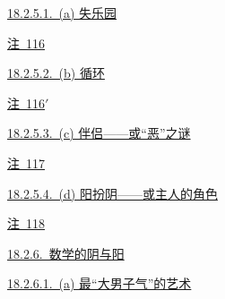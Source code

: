 \par\noindent\hspace*{2.70em}\hyperref[ch18:local:h22]{18.2.5.1.~(a) 失乐园}\nobreak\dotfill\nobreak\hyperref[ch18:local:h22]{\pageref*{ch18:local:h22}}\par
\par\noindent\hspace*{4.05em}\hyperref[ch18:local:n19]{注~116}\nobreak\dotfill\nobreak\hyperref[ch18:local:n19]{\pageref*{ch18:local:n19}}\par
\par\noindent\hspace*{2.70em}\hyperref[ch18:local:h23]{18.2.5.2.~(b) 循环}\nobreak\dotfill\nobreak\hyperref[ch18:local:h23]{\pageref*{ch18:local:h23}}\par
\par\noindent\hspace*{4.05em}\hyperref[ch18:local:n20]{注~116$'$}\nobreak\dotfill\nobreak\hyperref[ch18:local:n20]{\pageref*{ch18:local:n20}}\par
\par\noindent\hspace*{2.70em}\hyperref[ch18:local:h24]{18.2.5.3.~(c) 伴侣——或“恶”之谜}\nobreak\dotfill\nobreak\hyperref[ch18:local:h24]{\pageref*{ch18:local:h24}}\par
\par\noindent\hspace*{4.05em}\hyperref[ch18:local:n21]{注~117}\nobreak\dotfill\nobreak\hyperref[ch18:local:n21]{\pageref*{ch18:local:n21}}\par
\par\noindent\hspace*{2.70em}\hyperref[ch18:local:h25]{18.2.5.4.~(d) 阳扮阴——或主人的角色}\nobreak\dotfill\nobreak\hyperref[ch18:local:h25]{\pageref*{ch18:local:h25}}\par
\par\noindent\hspace*{4.05em}\hyperref[ch18:local:n22]{注~118}\nobreak\dotfill\nobreak\hyperref[ch18:local:n22]{\pageref*{ch18:local:n22}}\par
\par\noindent\hspace*{1.35em}\hyperref[ch18:local:h26]{18.2.6.~数学的阴与阳}\nobreak\dotfill\nobreak\hyperref[ch18:local:h26]{\pageref*{ch18:local:h26}}\par
\par\noindent\hspace*{2.70em}\hyperref[ch18:local:h27]{18.2.6.1.~(a) 最“大男子气”的艺术}\nobreak\dotfill\nobreak\hyperref[ch18:local:h27]{\pageref*{ch18:local:h27}}\par
